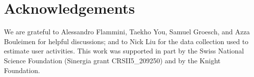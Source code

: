\documentclass{article}
\begin{document}
\section*{Acknowledgements}

We are grateful to Alessandro Flammini, Taekho You, Samuel Groesch, and Azza Bouleimen for helpful discussions; and to Nick Liu for the data collection used to estimate user activities. This work was supported in part by the Swiss National Science Foundation (Sinergia grant CRSII5\_209250) and by the Knight Foundation.



\end{document}
